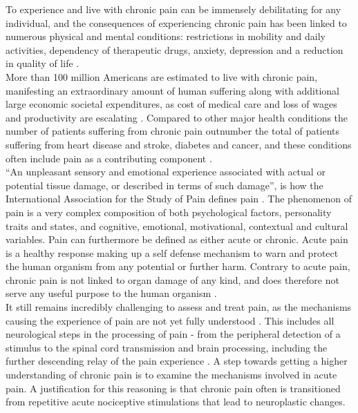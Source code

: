 To experience and live with chronic pain can be immensely debilitating for any individual, and the consequences of experiencing chronic pain has been linked to numerous physical and mental conditions: restrictions in mobility and daily activities, dependency of therapeutic drugs, anxiety, depression and a reduction in quality of life \cite{Dahlhamer2018,NationalCenterforHealthStatisticsHealth2011}. \\ More than 100 million Americans are estimated to live with chronic pain, manifesting an extraordinary amount of human suffering along with additional large economic societal expenditures, as cost of medical care and loss of wages and productivity are escalating  \cite{InstituteofMedicine2011,Davis2017}. Compared to other major health conditions the number of patients suffering from chronic pain outnumber the total of patients suffering from heart disease and stroke, diabetes and cancer, and these conditions often include pain as a contributing component \cite{NationalCenterforHealthStatisticsHealth2011}. \\
“An unpleasant sensory and emotional experience associated with actual or potential tissue damage, or described in terms of such damage”, is how the International Association for the Study of Pain defines pain \cite{Merskey1994}. The phenomenon of pain is a very complex composition of both psychological factors, personality traits and states, and cognitive, emotional, motivational, contextual and cultural variables. Pain can furthermore be defined as either acute or chronic. Acute pain is a healthy response making up a self defense mechanism to warn and protect the human organism from any potential or further harm. \cite{Davis2017,Brook2011,Garland2013} Contrary to acute pain, chronic pain is not linked to organ damage of any kind, and does therefore not serve any useful purpose to the human organism \cite{Schmidt1986}. \\
It still remains incredibly challenging to assess and treat pain, as the mechanisms causing the experience of pain are not yet fully understood \cite{Nielsen2008,Coghill2011}. This includes all neurological steps in the processing of pain - from the peripheral detection of a stimulus to the spinal cord transmission and brain processing, including the further descending relay of the pain experience \cite{Feizerfan2015}. A step towards getting a higher understanding of chronic pain is to examine the mechanisms involved in acute pain. A justification for this reasoning is that chronic pain often is transitioned from repetitive acute nociceptive stimulations that lead to neuroplastic changes. \cite{Feizerfan2015, Mcgreevy2012}\\
